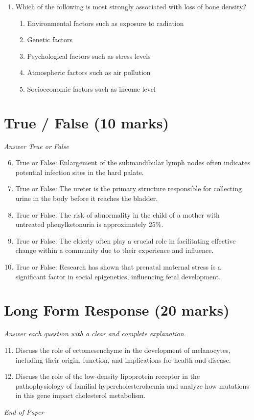 \documentclass[12pt]{article}
\begin{document}
\begin{enumerate}[label=\arabic*.]
\begin{enumerate}[label=(\alph*)]
    \item Interacting with a plasma cell
    \item Interacting with a virus infected cell
\end{enumerate}
\item Which of the following is most strongly associated with loss of bone density?
\begin{enumerate}[label=(\alph*)]
    \item Environmental factors such as exposure to radiation
    \item Genetic factors
    \item Psychological factors such as stress levels
    \item Atmospheric factors such as air pollution
    \item Socioeconomic factors such as income level
\end{enumerate}
\end{enumerate}

\section*{True / False (10 marks)}
\textit{Answer True or False}
\begin{enumerate}[label=\arabic*.]
\setcounter{enumi}{5}
\item True or False: Enlargement of the submandibular lymph nodes often indicates potential infection sites in the hard palate.
\item True or False: The ureter is the primary structure responsible for collecting urine in the body before it reaches the bladder.
\item True or False: The risk of abnormality in the child of a mother with untreated phenylketonuria is approximately 25\%.
\item True or False: The elderly often play a crucial role in facilitating effective change within a community due to their experience and influence.
\item True or False: Research has shown that prenatal maternal stress is a significant factor in social epigenetics, influencing fetal development.
\end{enumerate}

\section*{Long Form Response (20 marks)}
\textit{Answer each question with a clear and complete explanation.}
\begin{enumerate}[label=\arabic*.]
\setcounter{enumi}{10}
\item Discuss the role of ectomesenchyme in the development of melanocytes, including their
origin, function, and implications for health and disease.
\item Discuss the role of the low-density lipoprotein receptor in the pathophysiology of
familial hypercholesterolaemia and analyze how mutations in this gene impact cholesterol
metabolism.
\end{enumerate}

\vfill
\noindent\textit{End of Paper}
\end{document}
